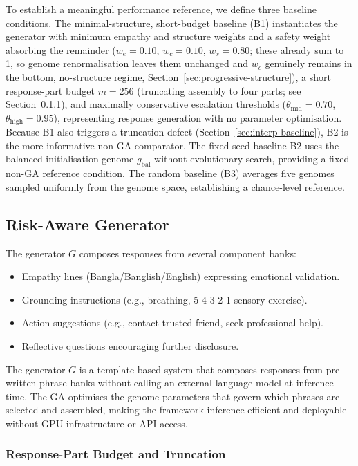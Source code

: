 \documentclass[mathematics,article,submit,xetex,moreauthors]{Definitions/mdpi}
\begin{document}
To establish a meaningful performance reference, we define three baseline
conditions. The minimal-structure, short-budget baseline (B1) instantiates the generator with
minimum empathy and structure weights and a safety weight absorbing the
remainder ($w_e = 0.10$, $w_c = 0.10$, $w_s = 0.80$; these already sum to
1, so genome renormalisation leaves them unchanged and $w_c$ genuinely
remains in the bottom, no-structure regime, Section~\ref{sec:progressive-structure}),
a short
response-part budget $m = 256$ (truncating assembly to four parts; see
Section~\ref{sec:part-budget}), and maximally conservative escalation thresholds
($\theta_\mathrm{mid} = 0.70$, $\theta_\mathrm{high} = 0.95$), representing
response generation with no parameter optimisation. Because B1 also triggers a truncation defect (Section~\ref{sec:interp-baseline}), B2 is the more informative non-GA comparator.
The fixed seed baseline B2 uses the balanced initialisation genome
$g_{\mathrm{bal}}$ without evolutionary search, providing a fixed non-GA
reference condition.
The random baseline (B3) averages five genomes sampled uniformly from the
genome space, establishing a chance-level reference.

\subsection{Risk-Aware Generator}
\label{sec:generator}

The generator \(G\) composes responses from several component banks:
\begin{itemize}
  \item Empathy lines (Bangla/Banglish/English) expressing emotional validation.
  \item Grounding instructions (e.g., breathing, 5-4-3-2-1 sensory exercise).
  \item Action suggestions (e.g., contact trusted friend, seek professional
        help).
  \item Reflective questions encouraging further disclosure.
\end{itemize}

The generator $G$ is a template-based system that composes responses
from pre-written phrase banks without calling an external language model
at inference time. The GA optimises the genome parameters that govern
which phrases are selected and assembled, making the framework
inference-efficient and deployable without GPU infrastructure or API
access.

\subsubsection{Response-Part Budget and Truncation}
\label{sec:part-budget}
\end{document}
